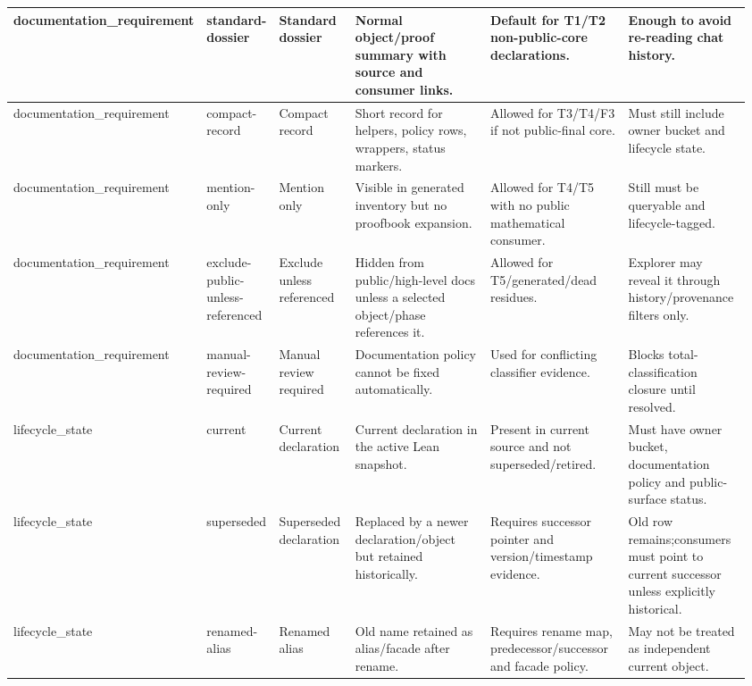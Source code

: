 \begin{longtable}{L{0.105\linewidth} L{0.095\linewidth} L{0.11\linewidth} L{0.255\linewidth} L{0.215\linewidth} L{0.185\linewidth}}
\hline
\addlinespace[0.24em]
documentation\_requirement & standard-dossier & Standard dossier & Normal object/\allowbreak{}proof summary with source and consumer links. & Default for T1/\allowbreak{}T2 non-public-core declarations. & Enough to avoid re-reading chat history.\\
\hline
\addlinespace[0.24em]
documentation\_requirement & compact-record & Compact record & Short record for helpers, policy rows, wrappers, status markers. & Allowed for T3/\allowbreak{}T4/\allowbreak{}F3 if not public-final core. & Must still include owner bucket and lifecycle state.\\
\hline
\addlinespace[0.24em]
documentation\_requirement & mention-only & Mention only & Visible in generated inventory but no proofbook expansion. & Allowed for T4/\allowbreak{}T5 with no public mathematical consumer. & Still must be queryable and lifecycle-tagged.\\
\hline
\addlinespace[0.24em]
documentation\_requirement & exclude-public-unless-referenced & Exclude unless referenced & Hidden from public/\allowbreak{}high-level docs unless a selected object/\allowbreak{}phase references it. & Allowed for T5/\allowbreak{}generated/\allowbreak{}dead residues. & Explorer may reveal it through history/\allowbreak{}provenance filters only.\\
\hline
\addlinespace[0.24em]
documentation\_requirement & manual-review-required & Manual review required & Documentation policy cannot be fixed automatically. & Used for conflicting classifier evidence. & Blocks total-classification closure until resolved.\\
\hline
\addlinespace[0.24em]
lifecycle\_state & current & Current declaration & Current declaration in the active Lean snapshot. & Present in current source and not superseded/\allowbreak{}retired. & Must have owner bucket, documentation policy and public-surface status.\\
\hline
\addlinespace[0.24em]
lifecycle\_state & superseded & Superseded declaration & Replaced by a newer declaration/\allowbreak{}object but retained historically. & Requires successor pointer and version/\allowbreak{}timestamp evidence. & Old row remains;\newline consumers must point to current successor unless explicitly historical.\\
\hline
\addlinespace[0.24em]
lifecycle\_state & renamed-alias & Renamed alias & Old name retained as alias/\allowbreak{}facade after rename. & Requires rename map, predecessor/\allowbreak{}successor and facade policy. & May not be treated as independent current object.\\

\end{longtable}
